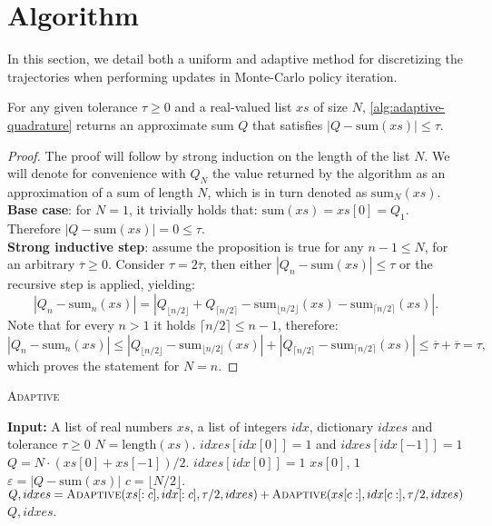 \section{Algorithm}
In this section, we detail both a uniform and adaptive method for discretizing the trajectories when performing updates in Monte-Carlo policy iteration. 
\begin{proposition}
    For any given tolerance $\tau \geq 0$ and a real-valued list $xs$ of size $N$, \cref{alg:adaptive-quadrature} returns an approximate sum $Q$ that satisfies $|Q - \text{sum}(xs)| \leq \tau$.  
\end{proposition}
\begin{proof}
    The proof will follow by strong induction on the length of the list $N$. We will denote for convenience with $Q_N$ the value returned by the algorithm as an approximation of a sum of length $N$, which is in turn denoted as $\text{sum}_N(xs)$. \\
    \textbf{Base case}: for $N=1$, it trivially holds that: $\text{sum}(xs)=xs[0]=Q_1$. Therefore $|Q - \text{sum}(xs)|=0\leq\tau$. \\
    \textbf{Strong inductive step}: assume the proposition is true for any $n-1\leq N$, for an arbitrary $\overline{\tau}\geq0$. Consider $\tau=2\overline{\tau}$, then either $|Q_n - \text{sum}(xs)|\leq\tau$ or the recursive step is applied, yielding:
    \begin{equation}
        |Q_n - \text{sum}_n(xs)| = |Q_{\lfloor n / 2 \rfloor} + Q_{\lceil n / 2 \rceil} - \text{sum}_{\lfloor n / 2 \rfloor}(xs) - \text{sum}_{\lceil n / 2 \rceil}(xs)|.
    \end{equation}
    Note that for every $n>1$ it holds $\lceil n / 2 \rceil\leq n-1$, therefore:
    \begin{equation}
        |Q_n - \text{sum}_n(xs)| \leq |Q_{\lfloor n / 2 \rfloor} - \text{sum}_{\lfloor n / 2 \rfloor}(xs)| + |Q_{\lceil n / 2 \rceil} - \text{sum}_{\lceil n / 2 \rceil}(xs)|\leq \overline{\tau} + \overline{\tau} = \tau,
    \end{equation}
    which proves the statement for $N=n$.
\end{proof}

\begin{algorithm}[t]
    \caption{\textsc{Adaptive}}\label{alg:adaptive-quadrature}
    \begin{algorithmic}
    \State \textbf{Input:} A list of real numbers $xs$, a list of integers $idx$, dictionary $idxes$ and tolerance $\tau \geq 0$
    \State $N = \text{length}(xs)$.
        \State $idxes[idx[0]] = 1$ and $idxes[idx[-1]] = 1$
        \State $Q = N \cdot (xs[0] + xs[-1]) / 2$.
    \Else
        \State $idxes[idx[0]] =1$
        \State \Return $xs[0]$, $1$
    \EndIf
    \State $\varepsilon = |Q - \text{sum}(xs)|$
    \If{$\varepsilon \geq \tau$}
        \State $c = \lfloor N / 2 \rfloor$.
        \State $Q, idxes = \textsc{Adaptive}(xs[:c], idx[:c], \tau /2, idxes) + \textsc{Adaptive}(xs[c:], idx[c:], \tau /2, idxes)$
    \EndIf
    \State \Return $Q, idxes$.
    \end{algorithmic}
    \end{algorithm}


